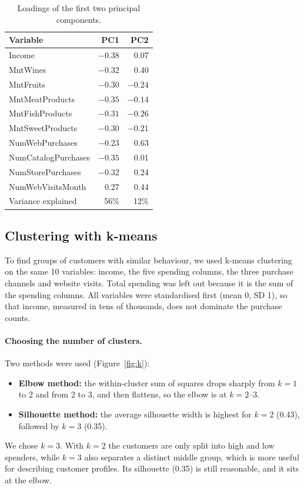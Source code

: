 \documentclass[11pt,a4paper]{article}
\begin{document}
\begin{table}[H]
	\centering
	\small
	\begin{tabular}{lrr}
		\toprule
		Variable            & PC1     & PC2     \\
		\midrule
		Income              & $-0.38$ & 0.07    \\
		MntWines            & $-0.32$ & 0.40    \\
		MntFruits           & $-0.30$ & $-0.24$ \\
		MntMeatProducts     & $-0.35$ & $-0.14$ \\
		MntFishProducts     & $-0.31$ & $-0.26$ \\
		MntSweetProducts    & $-0.30$ & $-0.21$ \\
		NumWebPurchases     & $-0.23$ & 0.63    \\
		NumCatalogPurchases & $-0.35$ & 0.01    \\
		NumStorePurchases   & $-0.32$ & 0.24    \\
		NumWebVisitsMonth   & 0.27    & 0.44    \\
		\midrule
		Variance explained  & 56\%    & 12\%    \\
		\bottomrule
	\end{tabular}
	\caption{Loadings of the first two principal components.}
	\label{tab:pca}
\end{table}

\subsection{Clustering with k-means}
To find groups of customers with similar behaviour, we used k-means clustering on the same 10 variables: income, the five spending columns, the three purchase channels and website visits. Total spending was left out because it is the sum of the spending columns. All variables were standardised first (mean 0, SD 1), so that income, measured in tens of thousands, does not dominate the purchase counts.

\paragraph{Choosing the number of clusters.} Two methods were used (Figure~\ref{fig:k}):
\begin{itemize}
	\item \textbf{Elbow method:} the within-cluster sum of squares drops sharply from $k = 1$ to 2 and from 2 to 3, and then flattens, so the elbow is at $k = 2$--3.
	\item \textbf{Silhouette method:} the average silhouette width is highest for $k = 2$ (0.43), followed by $k = 3$ (0.35).
\end{itemize}
We chose $k = 3$. With $k = 2$ the customers are only split into high and low spenders, while $k = 3$ also separates a distinct middle group, which is more useful for describing customer profiles. Its silhouette (0.35) is still reasonable, and it sits at the elbow.
\end{document}
